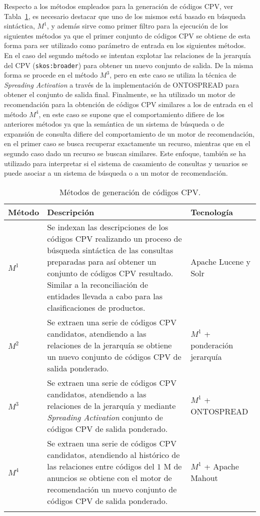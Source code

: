 \begin{enumerate}
Respecto a los métodos empleados para la generación de códigos \gls{CPV}, ver Tabla~\ref{table:metodos-ir}, es necesario destacar que uno de los mismos está basado 
en búsqueda sintáctica, $M^1$, y además sirve como primer filtro para la ejecución de los siguientes métodos ya que 
el primer conjunto de códigos CPV se obtiene de esta forma para ser utilizado como parámetro de entrada en los siguientes 
métodos. En el caso del segundo método se intentan explotar las relaciones de la jerarquía del CPV (\texttt{skos:broader}) para 
obtener un nuevo conjunto de salida. De la misma forma se procede en el método $M^3$, pero en este caso se utiliza la 
técnica de \textit{Spreading Activation} a través de la implementación de ONTOSPREAD para obtener el conjunto de salida 
final. Finalmente, se ha utilizado un motor de recomendación para la obtención de códigos CPV similares a los de entrada 
en el método $M^4$, en este caso se supone que el comportamiento difiere de los anteriores métodos ya que la semántica 
de un sistema de búsqueda o de expansión de consulta difiere del comportamiento de un motor de recomendación, en el primer 
caso se busca recuperar exactamente un recurso, mientras que en el segundo caso dado un recurso se buscan similares. Este enfoque, 
también se ha utilizado para interpretar si el sistema de casamiento de consultas y usuarios se puede asociar a un sistema 
de búsqueda o a un motor de recomendación.

\begin{longtable}[c]{|l|p{8cm}|p{4.5cm}|} 
\hline
\textbf{Método} &  \textbf{Descripción} &  \textbf{Tecnología} \\\hline
\endhead
$M^1$ & Se indexan las descripciones de los códigos CPV realizando un proceso de búsqueda sintáctica de las consultas preparadas para así 
obtener un conjunto de códigos CPV resultado. Similar a la reconciliación de entidades llevada a cabo para las clasificaciones de productos. & Apache Lucene y Solr \\ \hline
$M^2$ & Se extraen una serie de códigos CPV candidatos, atendiendo a las relaciones de la jerarquía se obtiene un nuevo 
conjunto de códigos CPV de salida ponderado. & $M^1$ + ponderación jerarquía \\ \hline
$M^3$ & Se extraen una serie de códigos CPV candidatos, atendiendo a las relaciones de la jerarquía y mediante \textit{Spreading Activation} 
conjunto de códigos CPV de salida ponderado. & $M^1$ + ONTOSPREAD \\ \hline
$M^4$ & Se extraen una serie de códigos CPV candidatos, atendiendo al histórico de las relaciones 
entre códigos del $1$ M de anuncios se obtiene con el motor de recomendación un nuevo 
conjunto de códigos CPV de salida ponderado. & $M^1$ + Apache Mahout \\ \hline
\hline
\caption{Métodos de generación de códigos CPV.}\label{table:metodos-ir}\\    
\end{longtable}


\end{enumerate}
